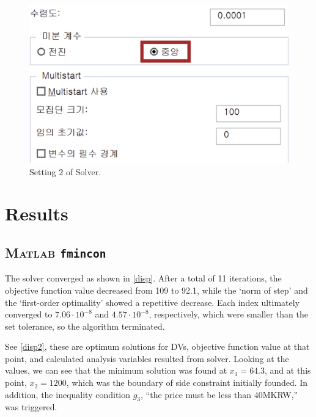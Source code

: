 \documentclass[11pt,twocolumn]{article}
\begin{document}
            \begin{figure}[h]
                    \centering
                    \includegraphics[width=.8\columnwidth]{Excel4.png}
                    \caption{Setting 2 of Solver.}
                    \label{setting2}
            \end{figure}

        
    \section{Results}
        \subsection{\textsc{Matlab} \texttt{fmincon}}
            The solver converged as shown in \cref{disp}.
            After a total of 11 iterations, the objective function value decreased from 109 to 92.1, while the `norm of step' and the `first-order optimality' showed a repetitive decrease.
            Each index ultimately converged to $7.06\cdot 10^{-8}$ and $4.57\cdot 10^{-8}$, respectively, which were smaller than the set tolerance, so the algorithm terminated.
            \par
            See \cref{disp2}, these are optimum solutions for DVs, objective function value at that point, and calculated analysis variables resulted from solver.
            Looking at the values, we can see that the minimum solution was found at $x_1=64.3$, and at this point, $x_2 = 1200$, which was the boundary of side constraint initially founded.
            In addition, the inequality condition $g_3$, ``the price must be less than 40MKRW,'' was triggered.
\end{document}
